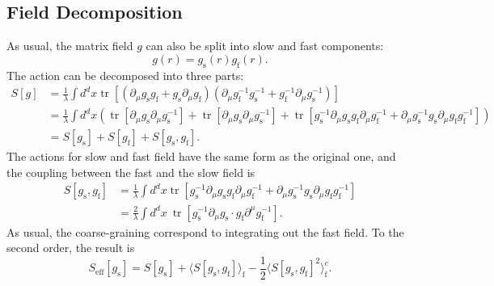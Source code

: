 \documentclass[aps,prb,superscriptaddress,nofootinbib]{revtex4}
\def \tr{\operatorname{tr}}
\begin{document}
\subsection{Field Decomposition}
As usual, the matrix field $g$ can also be split into slow and fast components:
\begin{equation}
	g(r) = g_{\mathrm{s}}(r) g_{\mathrm{f}}(r).
\end{equation}
The action can be decomposed into three parts:
\begin{equation}
\begin{aligned}
	S[g] &= \frac{1}{\lambda}\int d^d x \tr[(\partial_\mu g_{\mathrm{s}} g_{\mathrm{f}} + g_{\mathrm{s}} \partial_\mu g_{\mathrm{f}})(\partial_\mu g_{\mathrm{f}}^{-1} g_{\mathrm{s}}^{-1}+g_{\mathrm{f}}^{-1}\partial_\mu g_{\mathrm{s}}^{-1})] \\
	&= \frac{1}{\lambda}\int d^d x\left( \tr[\partial_\mu g_{\mathrm{s}} \partial_\mu g_{\mathrm{s}}^{-1}]+\tr[\partial_\mu g_{\mathrm{s}} \partial_\mu g_{\mathrm{s}}^{-1}]+\tr[g_{\mathrm{s}}^{-1}\partial_\mu g_{\mathrm{s}} g_{\mathrm{f}} \partial_\mu g_{\mathrm{f}}^{-1}+\partial_\mu g_{\mathrm{s}}^{-1} g_{\mathrm{s}} \partial_\mu g_{\mathrm{f}} g_{\mathrm{f}}^{-1}] \right) \\
	&= S[g_{\mathrm{s}}] + S[g_{\mathrm{f}}] + S[g_{\mathrm{s}},g_{\mathrm{f}}].
\end{aligned}
\end{equation}
The actions for slow and fast field have the same form as the original one, and the coupling between the fast and the slow field is
\begin{equation}
\begin{aligned}
	S[g_{\mathrm{s}},g_{\mathrm{f}}] 
	&= \frac{1}{\lambda}\int d^d x \tr[g_{\mathrm{s}}^{-1}\partial_\mu g_{\mathrm{s}} g_{\mathrm{f}} \partial_\mu g_{\mathrm{f}}^{-1}+\partial_\mu g_{\mathrm{s}}^{-1} g_{\mathrm{s}} \partial_\mu g_{\mathrm{f}} g_{\mathrm{f}}^{-1}] \\
	&= \frac{2}{\lambda} \int d^d x\ \tr\left[g_{\mathrm{s}}^{-1}\partial_\mu g_{\mathrm{s}} \cdot g_{\mathrm{f}} \partial^\mu g_{\mathrm{f}}^{-1}\right].
\end{aligned}
\end{equation}
As usual, the coarse-graining correspond to integrating out the fast field.
To the second order, the result is
\begin{equation}
	S_{\mathrm{eff}}[g_{\mathrm{s}}] 
	= S[g_{\mathrm{s}}] + \langle S[g_{\mathrm{s}},g_{\mathrm{f}}]\rangle_{\mathrm{f}}-\frac{1}{2}\langle S[g_{\mathrm{s}},g_{\mathrm{f}}]^2\rangle^c_{\mathrm{f}}.
\end{equation}
\end{document}
